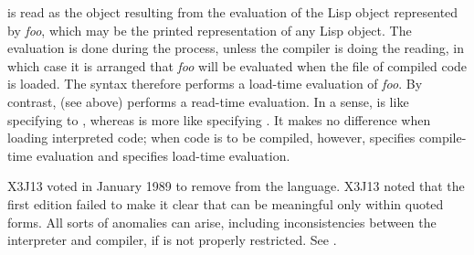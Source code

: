 \begin{obsolete}
\begin{flushdesc}
\item[\cd{\#,}]
 is read as the object resulting from the evaluation
of the Lisp object represented by \emph{foo},
which may be the printed representation of any Lisp object.
The evaluation is done during the  process,
unless the compiler is doing the reading, in which case it is arranged
that \emph{foo} will be evaluated when the file of compiled code is loaded.
The \cd{\#,} syntax therefore performs a load-time evaluation of \emph{foo}.
By contrast,  (see above) performs a read-time evaluation.
In a sense, \cd{\#,} is like specifying  to
, whereas  is more like specifying .
It makes no difference when loading interpreted code; when code
is to be compiled, however,  specifies compile-time evaluation and
\cd{\#,} specifies load-time evaluation.
\end{flushdesc}
\end{obsolete}

\begin{new}
X3J13 voted in January 1989
to remove \cd{\#,} from the language.
X3J13 noted that the first edition failed to make it clear that \cd{\#,}
can be meaningful only within quoted forms.  All sorts of anomalies can arise,
including inconsistencies between the interpreter and compiler, if \cd{\#,}
is not properly restricted.  See .
\end{new}

